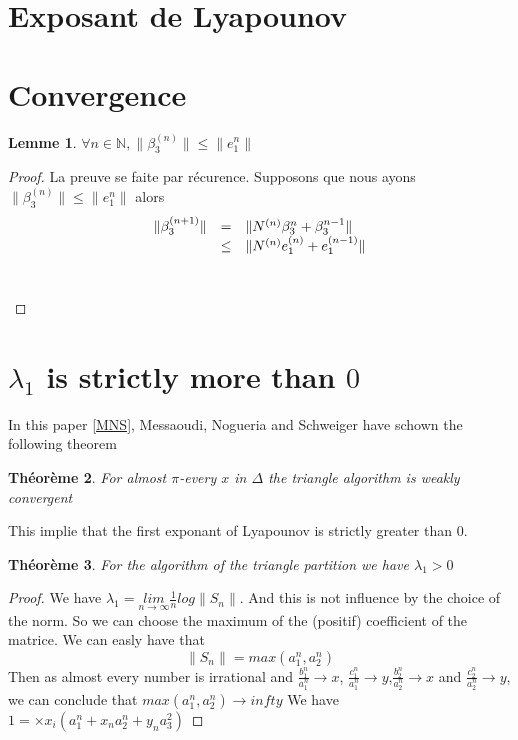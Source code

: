 \documentclass[12pt]{article}
\theoremstyle{plain}%
\newtheorem{thm}{Théorème}[section]
\newtheorem{lem}[thm]{Lemme}
\theoremstyle{definition}
\theoremstyle{remark}
\begin{document}
\section{Exposant de Lyapounov}

\section{Convergence}
\begin{lem}
$\forall n \in \mathbb{N}, \|\beta_3^{(n)}\| \leq \|e_1^{n}\|$
\end{lem}
\begin{proof}
La preuve se faite par récurence. Supposons que nous ayons $\|\beta_3^{(n)}\| \leq \|e_1^{n}\|$ alors \newline
\[
\begin{array}{c c l}
\| \beta_3^{(n+1)} \|& = & \|N^{(n)}\beta_3^{n} + \beta_3^{n-1}\| \\
& \leq & \|N^{(n)}e_1^{(n)}+e_1^{(n-1)} \| \\
& & \\
&  &
\end{array}
\]
\end{proof}
\section{$\lambda_1$ is strictly more than $0$}
In this paper \ref{MNS}, Messaoudi, Nogueria and Schweiger have schown the following theorem
\begin{thm}
For almost $\pi$-every $x$ in $\Delta$ the triangle algorithm is weakly convergent
\end{thm}
This implie that the first exponant of Lyapounov is strictly greater than $0$.
\begin{thm}
For the algorithm of the triangle partition we have $\lambda_1 > 0$
\end{thm}
\begin{proof}
We have $\lambda_1=\underset{n \to \infty}{lim}\frac{1}{n} log \| S_n \|$. And this is not influence by the choice of the norm. So we can choose the maximum of the (positif) coefficient of the matrice. We can easly have that \[
\| S_n \| = max(a_1^n,a_2^n)
\]
Then as almost every number is irrational and $\frac{b_1^n}{a_1^n} \to x$, $\frac{c_1^n}{a_1^n} \to y$,$\frac{b_2^n}{a_2^n} \to x$ and $\frac{c_2^n}{a_2^n} \to y$, we can conclude that $max(a^n_1,a^n_2) \to infty$
We have $1=\times x_i(a_1^n+x_n a_2^n+y_n a_3^2 )$
\end{proof}
\end{document}
